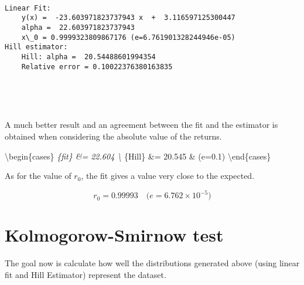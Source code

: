 \documentclass[11pt]{article}
\begin{document}
    \begin{center}
    \end{center}
    { \hspace*{\fill} \\}
    
    \begin{Verbatim}[commandchars=\\\{\}]
Linear Fit:
	y(x) =  -23.603971823737943 x  +  3.116597125300447
	alpha =  22.603971823737943
	x\_0 = 0.9999323809867176 (e=6.761901328244946e-05)
Hill estimator:
	Hill: alpha =  20.54488601994354
	Relative error = 0.10022376380163835

    \end{Verbatim}

    \begin{center}
    \end{center}
    { \hspace*{\fill} \\}
    
    \begin{center}
    \end{center}
    { \hspace*{\fill} \\}
    
    A much better result and an agreement between the fit and the estimator
is obtained when considering the absolute value of the returns.

\textbackslash{}begin\{cases\} \alpha\emph{\{fit\} \&= 22.604
\textbackslash{} \alpha}\{Hill\} \&= 20.545 \& \mbox{(}e=0.1\mbox{)}
\textbackslash{}end\{cases\}

As for the value of \(r_0\), the fit gives a value very close to the
expected.

\[r_0 = 0.99993 \quad \mbox{(}e=6.762\times10^{-5}\mbox{)}\]

    \hypertarget{kolmogorow-smirnow-test}{%
\section{Kolmogorow-Smirnow test}\label{kolmogorow-smirnow-test}}

The goal now is calculate how well the distributions generated above
(using linear fit and Hill Estimator) represent the dataset.
\end{document}
